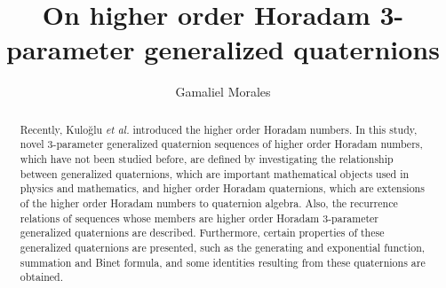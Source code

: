 \documentclass{kms-c}
\theoremstyle{plain}
\theoremstyle{definition}
\theoremstyle{remark}
\begin{document}
\title[On higher order Horadam 3-parameter generalized quaternions]
{On higher order Horadam 3-parameter generalized quaternions}

\author[G. Morales]{Gamaliel Morales}
\address{Gamaliel Morales \\ Instituto de Matem\'aticas \\ Pontificia Universidad Cat\'olica de Valpara\'iso \\ Blanco Viel 596, Chile}




\begin{abstract}
Recently, Kulo\u{g}lu {\it et al.} \cite{Kul} introduced the higher order Horadam numbers. In this study, novel 3-parameter generalized quaternion sequences of higher order Horadam numbers, which have not been studied before, are defined by investigating the relationship between generalized quaternions, which are important mathematical objects used in physics and mathematics, and higher order Horadam quaternions, which are extensions of the higher order Horadam numbers to quaternion algebra. Also, the recurrence relations of sequences whose members are higher order Horadam 3-parameter generalized quaternions are described. Furthermore, certain properties of these generalized quaternions are presented, such as the generating and exponential function, summation and Binet formula, and some identities resulting from these quaternions are obtained.

\end{abstract}

\maketitle
\end{document}
